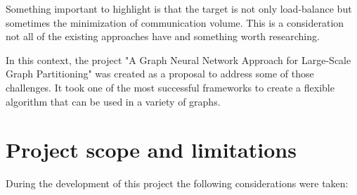 Something important to highlight is that the target is not only load-balance but sometimes the minimization of communication volume. This is a consideration not all of the existing approaches have and something worth researching.


In this context, the project "A Graph Neural Network Approach for Large-Scale Graph Partitioning" was created as a proposal to address some of those challenges. It took one of the most successful frameworks to create a flexible algorithm that can be used in a variety of graphs.


\section{Project scope and limitations}
During the development of this project the following considerations were taken:

